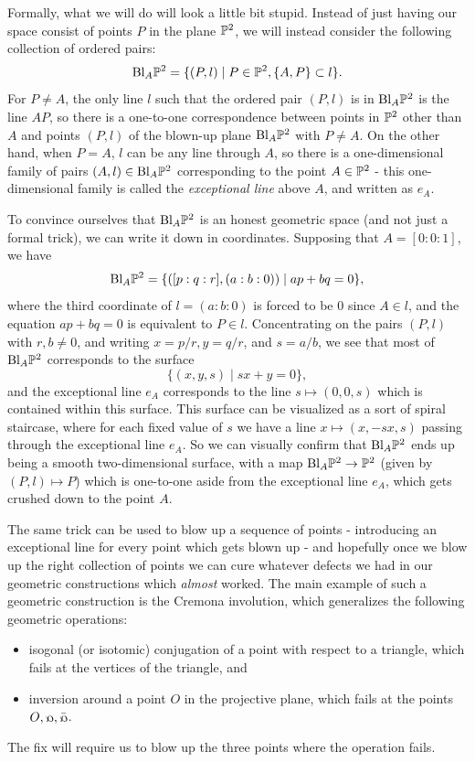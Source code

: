 Formally, what we will do will look a little bit stupid. Instead of just having our space consist of points $P$ in the plane $\mathbb{P}^2$, we will instead consider the following collection of ordered pairs:
\[
\text{\rm Bl}_{A}\mathbb{P}^2 = \{(P, l) \mid P \in \mathbb{P}^2, \{A,P\} \subset l\}.
\]
For $P \ne A$, the only line $l$ such that the ordered pair $(P,l)$ is in $\text{\rm Bl}_A\mathbb{P}^2$ is the line $AP$, so there is a one-to-one correspondence between points in $\mathbb{P}^2$ other than $A$ and points $(P,l)$ of the blown-up plane $\text{\rm Bl}_A\mathbb{P}^2$ with $P \ne A$. On the other hand, when $P = A$, $l$ can be any line through $A$, so there is a one-dimensional family of pairs $(A,l) \in \text{\rm Bl}_A\mathbb{P}^2$ corresponding to the point $A \in \mathbb{P}^2$ - this one-dimensional family is called the \emph{exceptional line} above $A$, and written as $e_A$.

To convince ourselves that $\text{\rm Bl}_A\mathbb{P}^2$ is an honest geometric space (and not just a formal trick), we can write it down in coordinates. Supposing that $A = [0:0:1]$, we have
\[
\text{\rm Bl}_A\mathbb{P}^2 = \{([p:q:r], (a:b:0)) \mid ap + bq = 0\},
\]
where the third coordinate of $l = (a:b:0)$ is forced to be $0$ since $A \in l$, and the equation $ap + bq = 0$ is equivalent to $P \in l$. Concentrating on the pairs $(P,l)$ with $r, b \ne 0$, and writing $x = p/r, y = q/r$, and $s = a/b$, we see that most of $\text{\rm Bl}_A\mathbb{P}^2$ corresponds to the surface
\[
\{(x,y,s) \mid sx + y = 0\},
\]
and the exceptional line $e_A$ corresponds to the line $s \mapsto (0,0,s)$ which is contained within this surface. This surface can be visualized as a sort of spiral staircase, where for each fixed value of $s$ we have a line $x \mapsto (x,-sx,s)$ passing through the exceptional line $e_A$. So we can visually confirm that $\text{\rm Bl}_A\mathbb{P}^2$ ends up being a smooth two-dimensional surface, with a map $\text{\rm Bl}_A \mathbb{P}^2 \rightarrow \mathbb{P}^2$ (given by $(P,l) \mapsto P$) which is one-to-one aside from the exceptional line $e_A$, which gets crushed down to the point $A$.

The same trick can be used to blow up a sequence of points - introducing an exceptional line for every point which gets blown up - and hopefully once we blow up the right collection of points we can cure whatever defects we had in our geometric constructions which \emph{almost} worked. The main example of such a geometric construction is the Cremona involution, which generalizes the following geometric operations:
\begin{itemize}
\item isogonal (or isotomic) conjugation of a point with respect to a triangle, which fails at the vertices of the triangle, and
\item inversion around a point $O$ in the projective plane, which fails at the points $O, \fish, \bar\fish$.
\end{itemize}
The fix will require us to blow up the three points where the operation fails.

